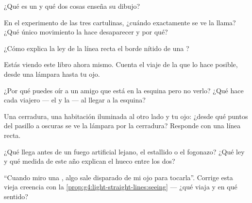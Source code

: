\begin{exercise}[$\star$]\label{exo:g4:light-straight-lines:2}
¿Qué es un  y qué dos cosas enseña su dibujo?
\end{exercise}

\begin{exercise}[$\star$]\label{exo:g4:light-straight-lines:3}
En el experimento de las tres cartulinas, ¿cuándo exactamente se ve la
llama? ¿Qué único movimiento la hace desaparecer y por qué?
\end{exercise}

\begin{exercise}[$\star$]\label{exo:g4:light-straight-lines:4}
¿Cómo explica la ley de la línea recta el borde nítido de una
?
\end{exercise}

\begin{exercise}[$\star$]\label{exo:g4:light-straight-lines:5}
Estás viendo este libro ahora mismo. Cuenta el viaje de la  que
lo hace posible, desde una lámpara hasta tu ojo.
\end{exercise}

\begin{exercise}[$\star$]\label{exo:g4:light-straight-lines:6}
¿Por qué puedes oír a un amigo que está en la esquina pero no verlo?
¿Qué hace cada viajero --- el  y la  --- al llegar a la
esquina?
\end{exercise}

\begin{exercise}[$\star$]\label{exo:g4:light-straight-lines:7}
Una cerradura, una habitación iluminada al otro lado y tu ojo: ¿desde
qué puntos del pasillo a oscuras se ve la lámpara por la cerradura?
Responde con una línea recta.
\end{exercise}

\begin{exercise}[$\star$]\label{exo:g4:light-straight-lines:8}
¿Qué llega antes de un fuego artificial lejano, el estallido o el
fogonazo? ¿Qué ley y qué medida de este año explican el hueco entre
los dos?
\end{exercise}

\begin{exercise}[$\star$]\label{exo:g4:light-straight-lines:9}
``Cuando miro una , algo sale disparado de mi ojo para
tocarla''. Corrige esta vieja creencia con la
\cref{prop:g4:light-straight-lines:seeing} --- ¿qué viaja y en qué
sentido?
\end{exercise}

